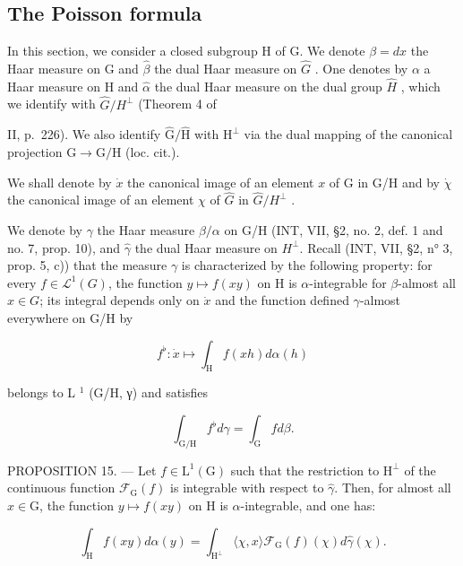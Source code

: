 \subsection{The Poisson formula}

In this section, we consider a closed subgroup H of G. We denote \(\beta = dx\) the Haar measure on G and \(\widehat{\beta}\) the dual Haar measure on \(\widehat{G}\) . One denotes by \(\alpha\) a Haar measure on H and \(\widehat{\alpha}\) the dual Haar measure on the dual group \(\widehat{H}\) , which we identify with \(\widehat{G}/H^{\perp}\) (Theorem 4 of

II, p.~226). We also identify \(\widehat{\mathrm{G}}/\widehat{\mathrm{H}}\) with \(\mathrm{H}^{\perp}\) via the dual mapping of the canonical projection \(\mathrm{G}\to\mathrm{G}/\mathrm{H}\) (loc. cit.).

We shall denote by \(\dot{x}\) the canonical image of an element \(x\) of G in G/H and by \(\dot{\chi}\) the canonical image of an element \(\chi\) of \(\widehat{G}\) in \(\widehat{G}/H^{\perp}\) .

We denote by \(\gamma\) the Haar measure \(\beta/\alpha\) on G/H (INT, VII, §2, no. 2, def. 1 and no. 7, prop. 10), and \(\widehat{\gamma}\) the dual Haar measure on \(H^{\perp}\). Recall (INT, VII, §2, n° 3, prop. 5, c)) that the measure \(\gamma\) is characterized by the following property: for every \(f \in \mathcal{L}^{1}(G)\), the function \(y \mapsto f(xy)\) on H is \(\alpha\)-integrable for \(\beta\)-almost all \(x \in G\); its integral depends only on \(\dot{x}\) and the function defined \(\gamma\)-almost everywhere on G/H by

\[
f ^ {\flat} \colon \dot {x} \mapsto \int_ {\mathrm{H}} f (x h) d \alpha (h)
\]

belongs to L \(^{1}\) (G/H, γ) and satisfies

\[
\int_ {\mathrm{G} / \mathrm{H}} f ^ {\flat} d \gamma = \int_ {\mathrm{G}} f d \beta .\tag{33}
\]

PROPOSITION 15. --- Let \(f \in \mathrm{L}^1(\mathrm{G})\) such that the restriction to \(\mathrm{H}^\perp\) of the continuous function \(\mathcal{F}_{\mathrm{G}}(f)\) is integrable with respect to \(\widehat{\gamma}\). Then, for almost all \(x \in \mathrm{G}\), the function \(y \mapsto f(xy)\) on \(\mathrm{H}\) is \(\alpha\)-integrable, and one has:

\[
\int_ {\mathrm{H}} f (x y) d \alpha (y) = \int_ {\mathrm{H} ^ {\perp}} \langle \chi , x \rangle \mathcal {F} _ {\mathrm{G}} (f) (\chi) d \widehat {\gamma} (\chi).
\]

